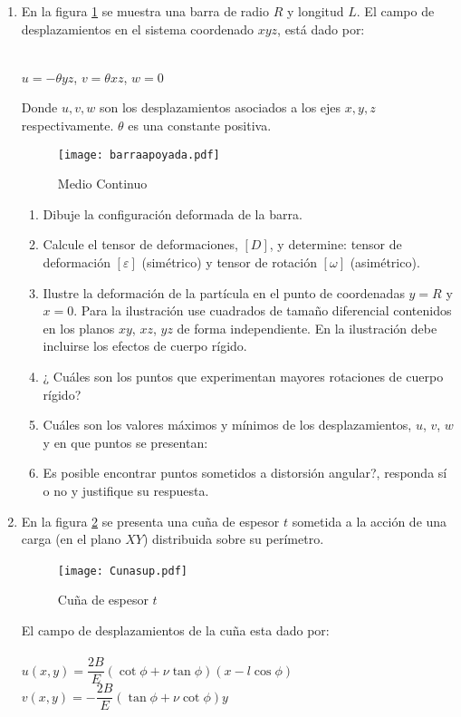 \documentclass[../notas medios.tex]{subfiles}
\begin{document}
\begin{enumerate}
\begin{enumerate}
\end{enumerate}
\item \label{punto08_d} En la figura \cref{BarraApoya} se muestra una barra de radio $R$ y longitud $L$. El campo de desplazamientos   en el sistema coordenado $xyz$, est\'a dado por:\\
\\
\begin{large}
	$u= -\theta yz$, \hspace*{15mm} $v= \theta xz $, \hspace*{15mm}$w= 0  $\\
\end{large}

%
Donde $u,v,w$ son los desplazamientos asociados a los ejes $x,y,z$ respectivamente. $\theta$ es una constante positiva. \\ 
\begin{figure}[H]
	\centering
	\texttt{[image: barraapoyada.pdf]} 
	\caption{Medio Continuo}
	\label{BarraApoya}
\end{figure}

\begin{enumerate}
\item Dibuje la configuraci\'on deformada de la barra. 
\item Calcule el tensor de deformaciones, $[D]$, y determine: tensor de deformaci\'on $[\varepsilon]$ (sim\'etrico) y tensor de rotaci\'on $[\omega]$ (asim\'etrico).
\item Ilustre la deformaci\'on de la part\'icula en el punto de coordenadas $y = R$ y $x = 0$. Para la ilustraci\'on use cuadrados de tama\~no diferencial contenidos en los planos $xy$, $xz$, $yz$ de forma independiente. En la ilustraci\'on debe incluirse los efectos de cuerpo r\'igido.
\item ¿ Cu\'ales son los puntos que experimentan mayores rotaciones de cuerpo r\'igido?
\item Cu\'ales son los valores máximos y mínimos de los desplazamientos, $u$, 
$v$, $w$ y en que puntos se presentan:
\item  \textquestiondown Es posible encontrar puntos sometidos a distorsión 
angular?, responda s\'i o no y justifique su respuesta.
\end{enumerate}

\item  \label{punto09_d} En la figura \cref{cuna} se presenta una cu\~na de espesor $t$ sometida a la acci\'on de una carga (en el plano $XY$) distribuida sobre su per\'imetro.
%
\begin{figure}[H]
	\centering
	{\texttt{[image: Cunasup.pdf]}}\
	\hspace{2 cm}
	\caption{Cu\~na de espesor $t$}
	\label{cuna}
\end{figure}
%
El campo de desplazamientos de la cu\~na  esta dado por:\\\\
%
 $ u(x,y) = \dfrac{2B}{E} (\cot \phi + \nu \tan \phi) (x - l\cos \phi) $
\hspace*{8mm} $ v(x,y) = - \dfrac{2B}{E} (\tan \phi + \nu \cot \phi) y$	


\end{enumerate}
\end{document}
